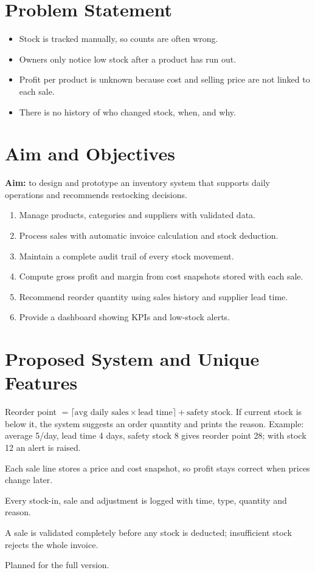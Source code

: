 \documentclass[11pt,a4paper]{article}
\begin{document}
\section{Problem Statement}
\begin{itemize}[noitemsep]
\item Stock is tracked manually, so counts are often wrong.
\item Owners only notice low stock after a product has run out.
\item Profit per product is unknown because cost and selling price are not linked to each sale.
\item There is no history of who changed stock, when, and why.
\end{itemize}

\section{Aim and Objectives}
\textbf{Aim:} to design and prototype an inventory system that supports daily operations and recommends restocking decisions.
\begin{enumerate}[noitemsep]
\item Manage products, categories and suppliers with validated data.
\item Process sales with automatic invoice calculation and stock deduction.
\item Maintain a complete audit trail of every stock movement.
\item Compute gross profit and margin from cost snapshots stored with each sale.
\item Recommend reorder quantity using sales history and supplier lead time.
\item Provide a dashboard showing KPIs and low-stock alerts.
\end{enumerate}

\section{Proposed System and Unique Features}
\begin{description}[noitemsep]
\item[Smart Restock Advisor] Reorder point $=\lceil \text{avg daily sales}\times\text{lead time}\rceil+\text{safety stock}$. If current stock is below it, the system suggests an order quantity and prints the reason. Example: average 5/day, lead time 4 days, safety stock 8 gives reorder point 28; with stock 12 an alert is raised.
\item[Profit Intelligence] Each sale line stores a price and cost snapshot, so profit stays correct when prices change later.
\item[Stock Movement Audit Trail] Every stock-in, sale and adjustment is logged with time, type, quantity and reason.
\item[All-or-nothing billing] A sale is validated completely before any stock is deducted; insufficient stock rejects the whole invoice.
\item[Expiry and dead-stock reports] Planned for the full version.
\end{description}
\end{document}
